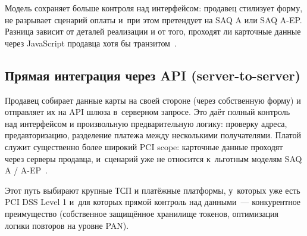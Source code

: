 Модель сохраняет больше контроля над интерфейсом: продавец
стилизует форму, не разрывает сценарий оплаты и~при
этом претендует на SAQ A или SAQ A-EP. Разница зависит
от деталей реализации и от того, проходят ли карточные данные
через JavaScript продавца хотя бы транзитом~\cite{pci-faq-1291,pci-faq-1293}.

\subsection*{Прямая интеграция через API (server-to-server)}

Продавец собирает данные карты на своей стороне
(через собственную форму) и отправляет их на API шлюза
в~серверном запросе. Это даёт полный контроль над
интерфейсом и произвольную предварительную логику:
проверку адреса, предавторизацию, разделение платежа
между несколькими получателями. Платой служит
существенно более широкий PCI scope: карточные данные проходят
через серверы продавца, и~сценарий уже не относится к~льготным
моделям SAQ A / A-EP~\cite{pci-faq-1291,pci-faq-1293,pci-saq}.

Этот путь выбирают крупные ТСП и платёжные платформы,
у~которых уже есть PCI DSS Level 1 и~для которых прямой
контроль над данными~--- конкурентное преимущество
(собственное защищённое хранилище токенов, оптимизация логики
повторов на уровне PAN).


